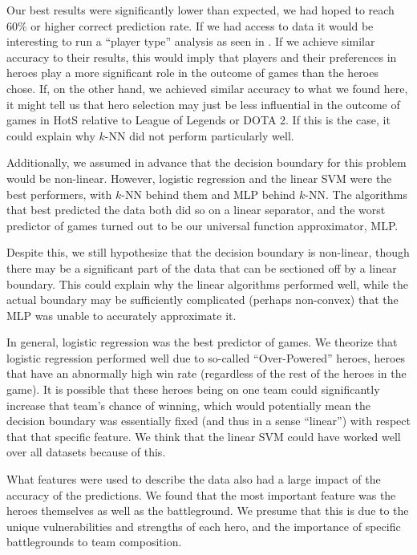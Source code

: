 \documentclass[11pt,letterpaper]{article}
\begin{document}
Our best results were significantly lower than expected, we had hoped to reach 60\% or higher correct prediction rate. If we had access to data it would be interesting to run a ``player type'' analysis as seen in \cite{ODP:15}. If we achieve similar accuracy to their results, this would imply that players and their preferences in heroes play a more significant role in the outcome of games than the heroes chose. If, on the other hand, we achieved similar accuracy to what we found here, it might tell us that hero selection may just be less influential in the outcome of games in HotS relative to League of Legends or DOTA 2. If this is the case, it could explain why $k$-NN did not perform particularly well.

Additionally, we assumed in advance that the decision boundary for this problem would be non-linear. However, logistic regression and the linear SVM were the best performers, with $k$-NN behind them and MLP behind $k$-NN.  The algorithms that best predicted the data both did so on a linear separator, and the worst predictor of games turned out to be our universal function approximator, MLP.

Despite this, we still hypothesize that the decision boundary is non-linear, though there may be a significant part of the data that can be sectioned off by a linear boundary. This could explain why the linear algorithms performed well, while the actual boundary may be sufficiently complicated (perhaps non-convex) that the MLP was unable to accurately approximate it. 

In general, logistic regression was the best predictor of games. We theorize that logistic regression performed well due to so-called ``Over-Powered'' heroes, heroes that have an abnormally high win rate (regardless of the rest of the heroes in the game). It is possible that these heroes being on one team could significantly increase that team's chance of winning, which would potentially mean the decision boundary was essentially fixed (and thus in a sense ``linear'') with respect that that specific feature. We think that the linear SVM could have worked well over all datasets because of this.

What features were used to describe the data also had a large impact of the accuracy of the predictions. We found that the most important feature was the heroes themselves as well as the battleground. We presume that this is due to the unique vulnerabilities and strengths of each hero, and the importance of specific battlegrounds to team composition. 
\end{document}
